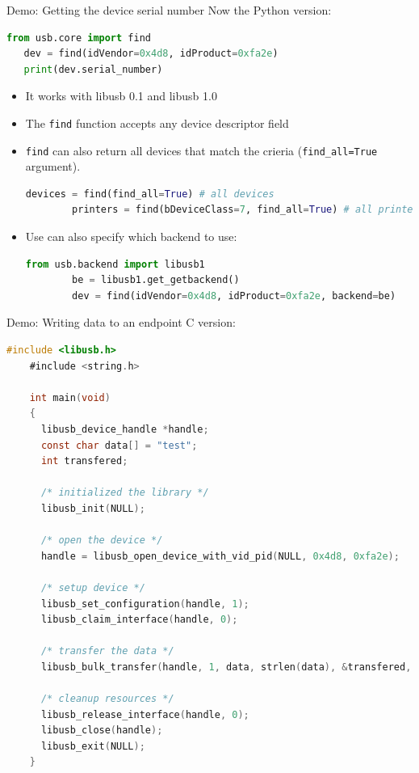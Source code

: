 \documentclass[pdf]{beamer}
\begin{document}
\begin{frame}[fragile]{Demo: Getting the device serial number}
  \tiny
  \pause
  Now the Python version:
  \pause
  \begin{lstlisting}[language=Python]
   from usb.core import find
   dev = find(idVendor=0x4d8, idProduct=0xfa2e)
   print(dev.serial_number)
  \end{lstlisting}

  \begin{itemize}
    \tiny
    \pause
    \item It works with libusb 0.1 and libusb 1.0
    \pause
    \item The \texttt{find} function accepts any device descriptor field
    \pause
    \item \texttt{find} can also return all devices that match the crieria
      (\texttt{find\_all=True} argument).
      \begin{lstlisting}[language=Python]
        devices = find(find_all=True) # all devices
        printers = find(bDeviceClass=7, find_all=True) # all printers
      \end{lstlisting}
    \pause
    \item Use can also specify which backend to use:
      \begin{lstlisting}[language=Python]
        from usb.backend import libusb1
        be = libusb1.get_getbackend()
        dev = find(idVendor=0x4d8, idProduct=0xfa2e, backend=be)
      \end{lstlisting}
  \end{itemize}
\end{frame}

\begin{frame}[fragile]{Demo: Writing data to an endpoint}
  \tiny
  \pause
  C version:
  \pause
  \begin{lstlisting}[language=C]
    #include <libusb.h>
    #include <string.h>

    int main(void)
    {
      libusb_device_handle *handle;
      const char data[] = "test";
      int transfered;

      /* initialized the library */
      libusb_init(NULL);

      /* open the device */
      handle = libusb_open_device_with_vid_pid(NULL, 0x4d8, 0xfa2e);

      /* setup device */
      libusb_set_configuration(handle, 1);
      libusb_claim_interface(handle, 0);

      /* transfer the data */
      libusb_bulk_transfer(handle, 1, data, strlen(data), &transfered, 1000);

      /* cleanup resources */
      libusb_release_interface(handle, 0);
      libusb_close(handle);
      libusb_exit(NULL);
    }
  \end{lstlisting}
\end{frame}
\end{document}

